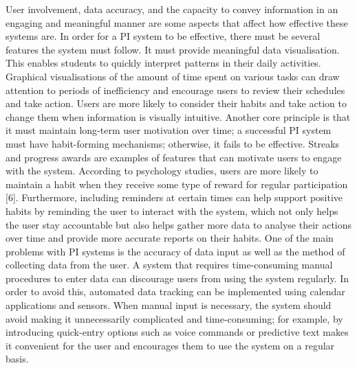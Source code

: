 \documentclass[12pt,a4paper]{article}
\begin{document}
User involvement, data accuracy, and the capacity to convey information in an engaging and meaningful manner are some aspects that affect how effective these systems are. In order for a PI system to be effective, there must be several features the system must follow. It must provide meaningful data visualisation. This enables students to quickly interpret patterns in their daily activities. Graphical visualisations of the amount of time spent on various tasks can draw attention to periods of inefficiency and encourage users to review their schedules and take action. Users are more likely to consider their habits and take action to change them when information is visually intuitive. Another core principle is that it must maintain long-term user motivation over time; a successful PI system must have habit-forming mechanisms; otherwise, it fails to be effective. Streaks and progress awards are examples of features that can motivate users to engage with the system. According to psychology studies, users are more likely to maintain a habit when they receive some type of reward for regular participation [6]. Furthermore, including reminders at certain times can help support positive habits by reminding the user to interact with the system, which not only helps the user stay accountable but also helps gather more data to analyse their actions over time and provide more accurate reports on their habits. One of the main problems with PI systems is the accuracy of data input as well as the method of collecting data from the user. A system that requires time-consuming manual procedures to enter data can discourage users from using the system regularly. In order to avoid this, automated data tracking can be implemented using calendar applications and sensors. When manual input is necessary, the system should avoid making it unnecessarily complicated and time-consuming; for example, by introducing quick-entry options such as voice commands or predictive text makes it convenient for the user and encourages them to use the system on a regular basis.
\end{document}
